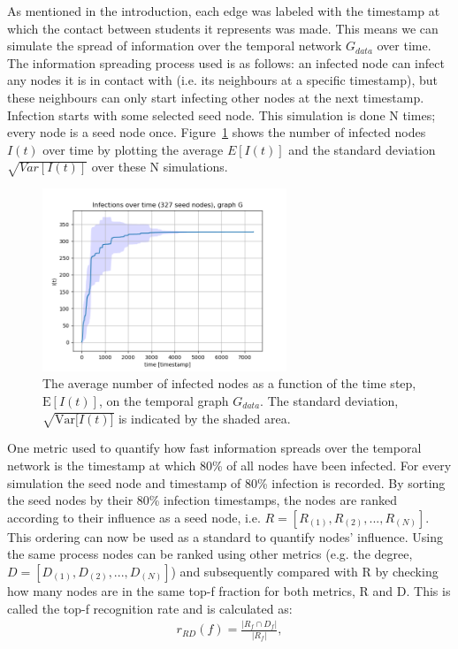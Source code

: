 \documentclass[letterpaper]{article}
\begin{document}
As mentioned in the introduction, each edge was labeled with the timestamp at which the contact between students it represents was made. This means we can simulate the spread of information over the temporal network \(G_{data}\) over time. 
The information spreading process used is as follows: an infected node can infect any nodes it is in contact with (i.e. its neighbours at a specific timestamp), but these neighbours can only start infecting other nodes at the next timestamp. Infection starts with some selected seed node. 
This simulation is done N times; every node is a seed node once. Figure~\ref{fig:infections_G} shows the number of infected nodes \(I(t)\) over time by plotting the average \(E[I(t)]\) and the standard deviation \(\sqrt{Var[I(t)]}\) over these N simulations.
\begin{figure}[ht!]
  \centering
   \includegraphics[width=0.65\textwidth]{img/infections_G.png}
   \caption{\small{The average number of infected nodes as a function of the time step, $\mathrm{E}[I(t)]$, on the temporal graph $G_{data}$. The standard deviation, $\sqrt{\mathrm{Var}{[I(t)}]}$ is indicated by the shaded area.}}
   \label{fig:infections_G}
\end{figure}

One metric used to quantify how fast information spreads over the temporal network is the timestamp at which 80\% of all nodes have been infected. For every simulation the seed node and timestamp of 80\% infection is recorded. By sorting the seed nodes by their 80\% infection timestamps, the nodes are ranked according to their influence as a seed node, i.e. \(R=[R_{(1)}, R_{(2)}, ..., R_{(N)}]\). This ordering can now be used as a standard to quantify nodes' influence. Using the same process nodes can be ranked using other metrics (e.g. the degree, \(D=[D_{(1)}, D_{(2)}, ..., D_{(N)}]\)) and subsequently compared with R by checking how many nodes are in the same top-f fraction for both metrics, R and D. This is called the top-f recognition rate and is calculated as:
\begin{align*}
	r_{RD}(f) = \frac{\left|R_f \cap D_f\right|}{\left|R_f\right|},
\end{align*}
\end{document}

